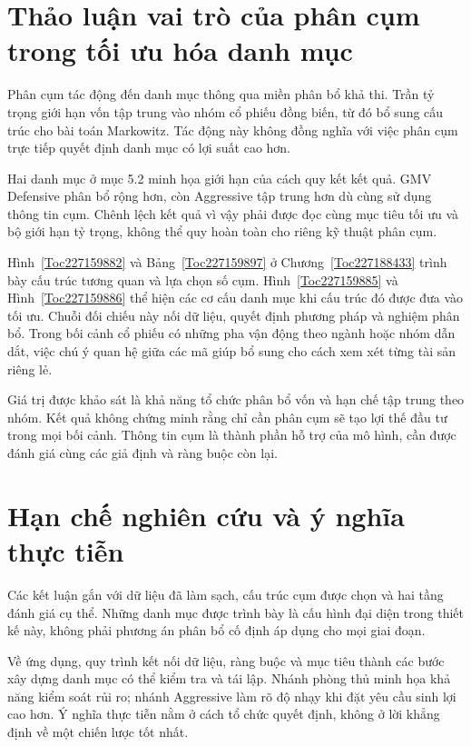 \documentclass[12pt,a4paper,openany,oneside]{book}
\begin{document}
\section{Thảo luận vai trò của phân cụm trong tối ưu hóa danh mục}\label{Toc227188451}
Phân cụm tác động đến danh mục thông qua miền phân bổ khả thi. Trần tỷ trọng giới hạn vốn tập trung vào nhóm cổ phiếu đồng biến, từ đó bổ sung cấu trúc cho bài toán Markowitz. Tác động này không đồng nghĩa với việc phân cụm trực tiếp quyết định danh mục có lợi suất cao hơn.

Hai danh mục ở mục 5.2 minh họa giới hạn của cách quy kết kết quả. GMV Defensive phân bổ rộng hơn, còn Aggressive tập trung hơn dù cùng sử dụng thông tin cụm. Chênh lệch kết quả vì vậy phải được đọc cùng mục tiêu tối ưu và bộ giới hạn tỷ trọng, không thể quy hoàn toàn cho riêng kỹ thuật phân cụm.

Hình~\ref{Toc227159882} và Bảng~\ref{Toc227159897} ở Chương~\ref{Toc227188433} trình bày cấu trúc tương quan và lựa chọn số cụm. Hình~\ref{Toc227159885} và Hình~\ref{Toc227159886} thể hiện các cơ cấu danh mục khi cấu trúc đó được đưa vào tối ưu. Chuỗi đối chiếu này nối dữ liệu, quyết định phương pháp và nghiệm phân bổ. Trong bối cảnh cổ phiếu có những pha vận động theo ngành hoặc nhóm dẫn dắt, việc chú ý quan hệ giữa các mã giúp bổ sung cho cách xem xét từng tài sản riêng lẻ.

Giá trị được khảo sát là khả năng tổ chức phân bổ vốn và hạn chế tập trung theo nhóm. Kết quả không chứng minh rằng chỉ cần phân cụm sẽ tạo lợi thế đầu tư trong mọi bối cảnh. Thông tin cụm là thành phần hỗ trợ của mô hình, cần được đánh giá cùng các giả định và ràng buộc còn lại.

\section{Hạn chế nghiên cứu và ý nghĩa thực tiễn}\label{Toc227188452}
Các kết luận gắn với dữ liệu đã làm sạch, cấu trúc cụm được chọn và hai tầng đánh giá cụ thể. Những danh mục được trình bày là cấu hình đại diện trong thiết kế này, không phải phương án phân bổ cố định áp dụng cho mọi giai đoạn.

Về ứng dụng, quy trình kết nối dữ liệu, ràng buộc và mục tiêu thành các bước xây dựng danh mục có thể kiểm tra và tái lập. Nhánh phòng thủ minh họa khả năng kiểm soát rủi ro; nhánh Aggressive làm rõ độ nhạy khi đặt yêu cầu sinh lợi cao hơn. Ý nghĩa thực tiễn nằm ở cách tổ chức quyết định, không ở lời khẳng định về một chiến lược tốt nhất.
\end{document}
